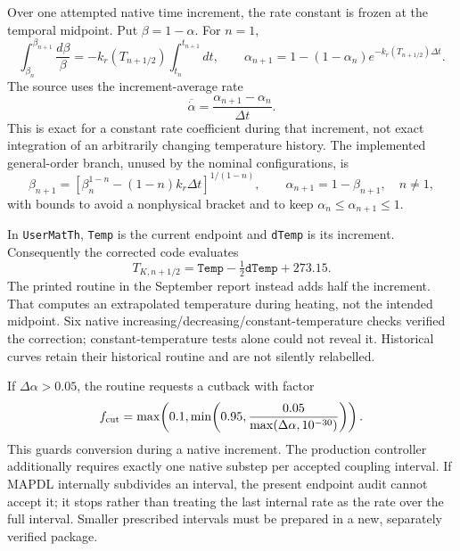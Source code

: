 Over one attempted native time increment, the rate constant is frozen at the temporal midpoint. Put $\beta=1-\alpha$. For $n=1$,
\begin{equation}
 \int_{\beta_n}^{\beta_{n+1}}\frac{d\beta}{\beta}
 =-k_r(T_{n+1/2})\int_{t_n}^{t_{n+1}}dt,
 \qquad
 \boxed{\alpha_{n+1}=1-(1-\alpha_n)e^{-k_r(T_{n+1/2})\Delta t}}.
\end{equation}
The source uses the increment-average rate
\begin{equation}
 \overline{\dot\alpha}=\frac{\alpha_{n+1}-\alpha_n}{\Delta t}.
\end{equation}
This is exact for a constant rate coefficient during that increment, not exact integration of an arbitrarily changing temperature history. The implemented general-order branch, unused by the nominal configurations, is
\begin{equation}
 \beta_{n+1}=\left[\beta_n^{1-n}-(1-n)k_r\Delta t\right]^{1/(1-n)},
 \qquad \alpha_{n+1}=1-\beta_{n+1},\quad n\ne1,
\end{equation}
with bounds to avoid a nonphysical bracket and to keep $\alpha_n\leq\alpha_{n+1}\leq1$.

In \texttt{UserMatTh}, \texttt{Temp} is the current endpoint and \texttt{dTemp} is its increment. Consequently the corrected code evaluates
\begin{equation}
 T_{K,n+1/2}=\texttt{Temp}-\tfrac12\texttt{dTemp}+273.15.
\end{equation}
The printed routine in the September report instead adds half the increment. That computes an extrapolated temperature during heating, not the intended midpoint. Six native increasing/decreasing/constant-temperature checks verified the correction; constant-temperature tests alone could not reveal it. Historical curves retain their historical routine and are not silently relabelled.

If $\Delta\alpha>0.05$, the routine requests a cutback with factor
\begin{equation}
 f_{\rm cut}=\max\!\left(0.1,\min\!\left(0.95,\frac{0.05}{\max(\Delta\alpha,10^{-30})}\right)\right).
\end{equation}
This guards conversion during a native increment. The production controller additionally requires exactly one native substep per accepted coupling interval. If MAPDL internally subdivides an interval, the present endpoint audit cannot accept it; it stops rather than treating the last internal rate as the rate over the full interval. Smaller prescribed intervals must be prepared in a new, separately verified package.

